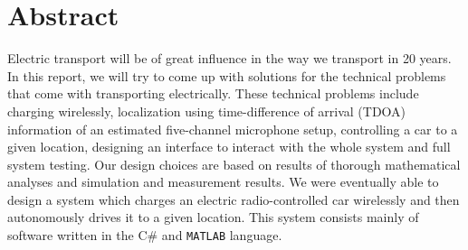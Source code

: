 \documentclass[11pt,titlepage]{report}
\begin{document}
\section*{Abstract}
Electric transport will be of great influence in the way we transport in 20 years. In this report, we will try to come up with solutions for the technical problems that come with transporting electrically. These technical problems include charging wirelessly, localization using time-difference of arrival (TDOA) information of an estimated five-channel microphone setup, controlling a car to a given location, designing an interface to interact with the whole system and full system testing. Our design choices are based on results of thorough mathematical analyses and simulation and measurement results. We were eventually able to design a system which charges an electric radio-controlled car wirelessly and then autonomously drives it to a given location. This system consists mainly of software written in the C\# and \texttt{MATLAB} language.
\end{document}

